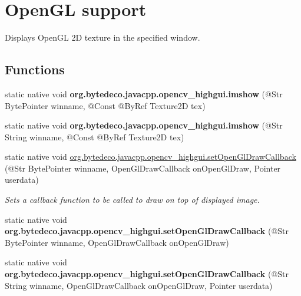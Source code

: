 \hypertarget{group__highgui__opengl}{}\section{Open\+GL support}
\label{group__highgui__opengl}


Displays Open\+GL 2D texture in the specified window.  


\subsection*{Functions}
\begin{DoxyCompactItemize}
\item 
\mbox{\label{group__highgui__opengl_gafebf6d0671141fb730ea0b432e205c56}} 
static native void {\bfseries org.\+bytedeco.\+javacpp.\+opencv\+\_\+highgui.\+imshow} (@Str Byte\+Pointer winname, @Const @By\+Ref Texture2D tex)
\item 
\mbox{\label{group__highgui__opengl_ga0256058e16bc933036be9254f9327dde}} 
static native void {\bfseries org.\+bytedeco.\+javacpp.\+opencv\+\_\+highgui.\+imshow} (@Str String winname, @Const @By\+Ref Texture2D tex)
\item 
static native void \hyperlink{group__highgui__opengl_ga4a0f34ee4ef2378ca514ab2190004a9c}{org.\+bytedeco.\+javacpp.\+opencv\+\_\+highgui.\+set\+Open\+Gl\+Draw\+Callback} (@Str Byte\+Pointer winname, Open\+Gl\+Draw\+Callback on\+Open\+Gl\+Draw, Pointer userdata)
\begin{DoxyCompactList}\small\item\em Sets a callback function to be called to draw on top of displayed image. \end{DoxyCompactList}\item 
\mbox{\label{group__highgui__opengl_ga49eda79b9740992eaa42bf3cb9f84b7d}} 
static native void {\bfseries org.\+bytedeco.\+javacpp.\+opencv\+\_\+highgui.\+set\+Open\+Gl\+Draw\+Callback} (@Str Byte\+Pointer winname, Open\+Gl\+Draw\+Callback on\+Open\+Gl\+Draw)
\item 
\mbox{\label{group__highgui__opengl_gaf7cbb695c6fa18fc4a7301b60b4f702a}} 
static native void {\bfseries org.\+bytedeco.\+javacpp.\+opencv\+\_\+highgui.\+set\+Open\+Gl\+Draw\+Callback} (@Str String winname, Open\+Gl\+Draw\+Callback on\+Open\+Gl\+Draw, Pointer userdata)

\end{DoxyCompactItemize}
